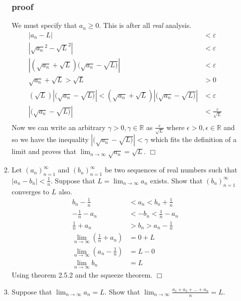 \documentclass[letterpaper]{article}
\begin{document}
\begin{enumerate}
\begin{enumerate}
  \subsubsection*{proof}
  We must specify that $a_n\ge0$. This is after all \emph{real} analysis.
  \begin{align*}
    \left\lvert a_n-L\right\rvert&<\varepsilon\\
    \left\lvert\sqrt{a_n}^2-\sqrt{L}^2\right\rvert&<\varepsilon\\
    \left\lvert(\sqrt{a_n}+\sqrt{L})(\sqrt{a_n}-\sqrt{L)}\right\rvert&<\varepsilon\\
    \sqrt{a_n}+\sqrt{L}>\sqrt{L}&>0\\
    (\sqrt{L})\left\lvert(\sqrt{a_n}-\sqrt{L)}\right\rvert<(\sqrt{a_n}+\sqrt{L})\left\lvert(\sqrt{a_n}-\sqrt{L)}\right\rvert&<\varepsilon\\
    \left\lvert(\sqrt{a_n}-\sqrt{L)}\right\rvert&<\frac{\varepsilon}{\sqrt{L}}\\
  \end{align*}
  Now we can write an arbitrary $\gamma>0,\gamma\in\mathbb{R}$ as $\frac{\varepsilon}{\sqrt{L}}$ where $\epsilon>0,\epsilon\in\mathbb{R}$ and so we have the inequality $\left\lvert(\sqrt{a_n}-\sqrt{L)}\right\rvert<\gamma$ which fits the definition of a limit and proves that $\displaystyle \lim_{n\to\infty}\sqrt{a_n}=\sqrt{L}$. $\Box$
  \item
  Let $(a_n)_{n=1}^\infty$ and $(b_n)_{n=1}^\infty$ be two sequences of real numbers such that $|a_n-b_n|<\frac{1}{n}$. Suppose that $\displaystyle L=\lim_{n\to\infty}a_n$ exists. Show that $(b_n)_{n=1}^\infty$ converges to $L$ also.
  \begin{align*}
    b_n-\frac{1}{n}&<a_n<b_n+\frac{1}{n}\\
    -\frac{1}{n}-a_n&<-b_n<\frac{1}{n}-a_n\\
    \frac{1}{n}+a_n&>b_n>a_n-\frac{1}{n}\\
    \lim_{n\to\infty}\left(\frac{1}{n}+a_n\right)&=0+L\\
    \lim_{n\to\infty}\left(a_n-\frac{1}{n}\right)&=L-0\\
    \lim_{n\to\infty}b_n&=L
  \end{align*}
  Using theorem 2.5.2 and the squeeze theorem. $\Box$
  \setcounter{enumii}{8}
  \item
  Suppose that $\displaystyle \lim_{n\to\infty} a_n=L$. Show that $\displaystyle \lim_{n\to\infty}\frac{a_1+a_2+\dots+a_n}{n}=L$.
  \end{enumerate}
\end{enumerate}
\end{document}
